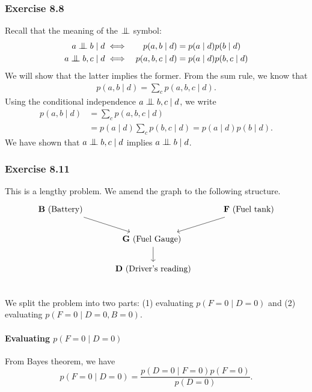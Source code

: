 \documentclass[12pt, a4paper]{article}
\newcommand{\bigCI}{\mathrel{\text{\scalebox{1.07}{$\perp\mkern-10mu\perp$}}}}
\begin{document}
\subsubsection*{Exercise 8.8}
Recall that the meaning of the $\bigCI$ symbol:
\begin{alignat*}{3}
	a \bigCI b \mid d &\iff & p(a, b \mid d) &=  p(a\mid d) p( b \mid d) \\
	a \bigCI b, c \mid d &\iff  & p(a, b, c \mid d) &=  p(a\mid d) p( b, c \mid d)
\end{alignat*}
We will show that the latter implies the former.
From the sum rule, we know that
\begin{align*}
	p(a, b \mid d) = \sum_c p(a, b, c \mid d).
\end{align*}
Using the conditional independence $a \bigCI b, c \mid d$, we write
\begin{align*}
p(a, b \mid d) &= \sum_c p(a, b, c \mid d) \\
&=  p(a\mid d) \sum_c  p( b, c \mid d) =  p(a\mid d)   p( b \mid d).
\end{align*}
We have shown that $a \bigCI b, c \mid d$ implies $a \bigCI b \mid d$.

\subsubsection*{Exercise 8.11}
This is a lengthy problem.
We amend the graph to the following structure.
\[\begin{tikzcd}[column sep=3em]
\textbf{B} \text{ (Battery)} \arrow[]{dr}{}  &     & \textbf{F} \text{ (Fuel tank)} \arrow[]{dl}{} \\
  &  \textbf{G} \text{ (Fuel Gauge) }\arrow[]{d}{} & \\
  &  \textbf{D} \text{ (Driver's reading)} & \\
\end{tikzcd}\]
We split the problem into two parts:
(1) evaluating $p(F=0 \mid D = 0)$ and
(2) evaluating $p(F=0 \mid D = 0, B=0)$.

\paragraph{Evaluating $p(F=0 \mid D = 0)$}
From Bayes theorem, we have
\begin{equation*}
	p(F=0 \mid D = 0) = \frac{p(D = 0 \mid F =0) p(F=0)}{p( D = 0)}.
\end{equation*}
\end{document}
